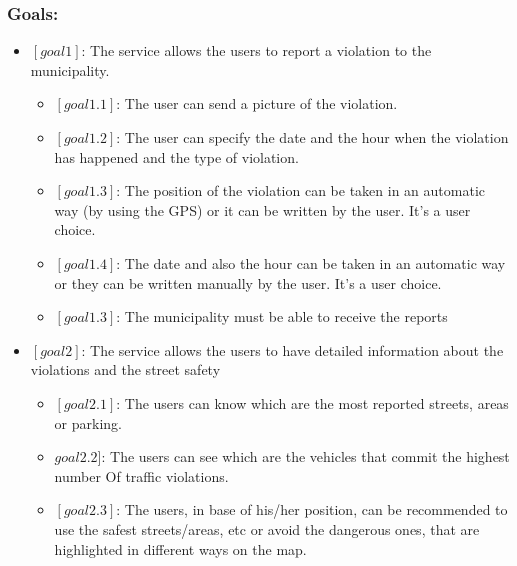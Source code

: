 \documentclass[titlepage]{article}
\begin{document}
\subsubsection{Goals:}
\begin{itemize}
\item $[goal 1]$:  The service allows the users to report a violation to the municipality.
\begin{itemize}

	\item $[goal 1.1]$: The user can send a picture of the 			violation.
	
	\item $[goal 1.2]$: The user can specify the date and the 						hour when the violation has happened 							and the type of violation.
	
	\item $[goal 1.3]$: The position of the violation can be 			                taken in an automatic way (by using 							the GPS) or it can be written by the 							user. It's a user choice.
	
	\item $[goal 1.4]$: The date and also the hour can be           		  taken in an automatic way or they can be written          		  manually by the user. It's a user choice.
	
	\item $[goal 1.3 ]$: The municipality must be able to     	receive the reports  \\
	
\end{itemize}

\item $[goal 2]$: The service allows the users to have detailed information about the violations and the street safety
      \begin{itemize}
      	\item $[goal 2.1]$: The users can know which are the 			most reported streets, areas or parking.
      	
      	\item $goal 2.2]$: The users can see which are the 				vehicles that commit the highest number
		Of traffic violations.
		
		\item $[goal 2.3]$: The users, in base of his/her 				position, can be recommended to use the safest 					streets/areas, etc or avoid the dangerous ones, that 			are highlighted in different ways on the map.\\


\end{itemize}
\end{itemize}
\end{document}

